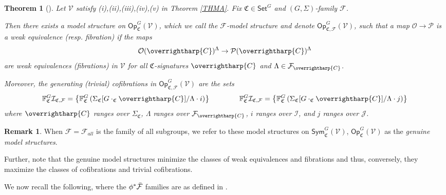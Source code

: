 \documentclass[a4paper,10pt
 ,final
]{article}%
\numberwithin{equation}{section}
\numberwithin{figure}{section}
\newtheorem{theorem}[equation]{Theorem}%
\theoremstyle{definition} %
\newtheorem{remark}[equation]{Remark}%
\newcommand{\vect}[1]{\text{\overrightharp{\ensuremath{#1}}}}
\newcommand{\F}{\ensuremath{\mathcal F}}
\newcommand{\V}{\ensuremath{\mathcal V}}
\renewcommand{\O}{\ensuremath{\mathcal O}}
\newcommand{\1}{\ensuremath{\mathbbm 1}}%
\begin{document}
\begin{theorem}
	[{\cite[Thm. \ref{OC-THMI}]{BP_FCOP}}]
	\label{THMIREST}
	Let $\V$ satisfy (i),(ii),(iii),(iv),(v) in Theorem \ref{THMA}.
	Fix $\mathfrak{C} \in \mathsf{Set}^G$
	and $(G,\Sigma)$-family $\F$.
	
	Then there exists a model structure on
	$\mathsf{Op}^G_{\mathfrak{C}}(\mathsf{\V})$,
	which we call the \emph{$\mathcal{F}$-model structure}
	and denote $\mathsf{Op}^G_{\mathfrak{C},\F}(\V)$,
	such that a map
	$\mathcal{O} \to \mathcal{P}$
	is a weak equivalence (resp. fibration) if the maps
	\begin{equation}\label{THMI_EQ}
	\O(\vect{C})^{\Lambda} \to \mathcal{P}(\vect{C})^{\Lambda}
	\end{equation}
	are weak equivalences (fibrations)
	in $\V$ for all $\mathfrak{C}$-signatures $\vect{C}$
	and $\Lambda \in \F_{\vect{C}}$.
	
	Moreover, the generating (trivial) cofibrations in
	$\mathsf{Op}^G_{\mathfrak{C},\F}(\V)$
	are the sets
	\begin{equation}\label{FVGSIGF EQ}
	\mathbb{F}^G_{\mathfrak{C}}\mathcal{I}_{\mathfrak{C},\mathcal{F}}
	=
	\left\{
	\mathbb{F}^G_{\mathfrak{C}}
	\left(\Sigma_{\mathfrak{C}}[G \cdot_{\mathfrak{C}} \vect{C}]/\Lambda \cdot i \right)
	\right\}
	\qquad \qquad
	\mathbb{F}^G_{\mathfrak{C}}\mathcal{I}_{\mathfrak{C},\mathcal{F}}
	=
	\left\{
	\mathbb{F}^G_{\mathfrak{C}}
	\left(\Sigma_{\mathfrak{C}}[G \cdot_{\mathfrak{C}} \vect{C}]/\Lambda \cdot j \right)
	\right\}
	\end{equation}
	where $\vect{C}$ ranges over $\Sigma_{\mathfrak{C}}$,
	$\Lambda$ ranges over $\F_{\vect{C}}$,
	$i$ ranges over $\mathcal{I}$,
	and $j$ ranges over $\mathcal{J}$.
\end{theorem}



\begin{remark}\label{FALLMAXMIN REM}
	When $\mathcal{F}=\mathcal{F}_{all}$ is the family of all subgroups,
	we refer to these model structures on 
	$\mathsf{Sym}^G_{\mathfrak{C}}(\V)$, $\mathsf{Op}^G_{\mathfrak{C}}(\V)$
	as the \emph{genuine model structures}.

	Further, note that the genuine model structures 
	minimize the classes of weak equivalences and fibrations
	and thus, conversely, 
	they maximize the classes of cofibrations and trivial cofibrations.
\end{remark}


We now recall the following,
where the $\phi^{\**} \bar{\F}$ families
are as defined in \cite[Rem. \ref{OC-PULLFAM REM}]{BP_FCOP}.
\end{document}
